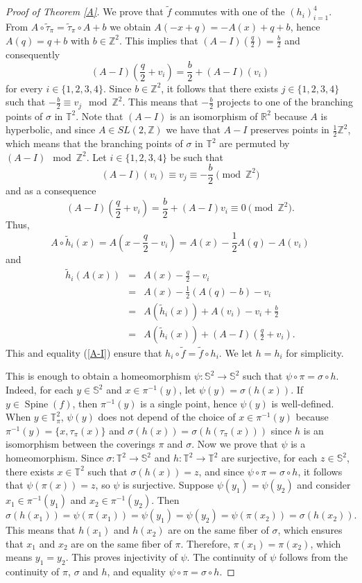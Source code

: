 \documentclass{amsart}
\theoremstyle{plain}
\theoremstyle{definition}
\newcommand{\spine}{\operatorname{Spine}}
\newcommand{\T}{\mathbb{T}}
\newcommand{\Z}{\mathbb{Z}}
\newcommand{\R}{\mathbb{R}}
\begin{document}
\begin{proof}[Proof of Theorem \ref{A}]
We prove that $\tilde f$ commutes with one of the $(h_i)_{i=1}^4$. From $A\circ\tilde\tau_{\pi}=\tilde\tau_{\pi}\circ A+b$ we obtain
$A(-x+q)=-A(x)+q+b$, hence $A(q)=q+b$ with $b\in\Z^2$. This implies that $(A-I)(\frac{q}{2})=\frac{b}{2}$ and consequently
\begin{equation}\label{A-I}
(A-I)\left(\frac{q}{2}+v_i\right)=\frac{b}{2}+(A-I)(v_i)
\end{equation}
for every $i\in\{1,2,3,4\}$. Since $b\in\Z^2$, it follows that there exists $j\in\{1,2,3,4\}$ such that $-\frac{b}{2}\equiv v_j\mod\Z^2$. This means that $-\frac{b}{2}$ projects to one of the branching points of $\sigma$ in $\T^2$. Note that $(A-I)$ is an isomorphism of $\R^2$ because $A$ is hyperbolic, and since $A\in SL(2,\Z)$ we have that $A-I$ preserves points in $\frac{1}{2}\Z^2$, which means that the branching points of $\sigma$ in $\T^2$ are permuted by $(A-I)\mod\Z^2$. Let $i\in\{1,2,3,4\}$ be such that $$(A-I)(v_i)\equiv v_j\equiv-\frac{b}{2}\pmod{\Z^2}$$ and as a consequence
$$(A-I)\left(\frac{q}{2} + v_i\right) = \frac{b}{2} + (A-I)v_i \equiv 0 \pmod{\mathbb{Z}^2}.$$
Thus,
$$A\circ\tilde h_i(x)=A\left(x-\frac{q}{2}-v_i\right)=A(x)-\frac{1}{2}A(q)-A(v_i)$$
and
\begin{eqnarray*}
\tilde h_i(A(x))&=&A(x)-\frac{q}{2}-v_i\\
&=&A(x)-\frac{1}{2}(A(q)-b)-v_i\\
&=&A(\tilde h_i(x))+A(v_i)-v_i+\frac{b}{2}\\
&=&A(\tilde h_i(x))+(A-I)\left(\frac{q}{2}+v_i\right).
\end{eqnarray*}
This and equality (\ref{A-I}) ensure that $h_i\circ\tilde f=\tilde f\circ h_i$. We let $h=h_i$ for simplicity.

This is enough to obtain a homeomorphism 
$\psi\colon\mathbb{S}^2\to\mathbb{S}^2$ such that $\psi\circ\pi = \sigma\circ h$.
Indeed, for each $y\in\mathbb{S}^2$ and $x\in \pi^{-1}(y)$, let $\psi(y)=\sigma(h(x))$. If $y\in\spine(f)$, then $\pi^{-1}(y)$ is a single point, hence $\psi(y)$ is well-defined. When $y\in\mathbb{T}^{2}_{\pi}$, $\psi(y)$ does not depend of the choice of $x\in \pi^{-1}(y)$ because $\pi^{-1}(y)=\{x,\tau_{\pi}(x)\}$ and $\sigma(h(x))=\sigma(h(\tau_{\pi}(x)))$ since $h$ is an isomorphism between the coverings $\pi$ and $\sigma$.
Now we prove that $\psi$ is a homeomorphism. Since $\sigma\colon\mathbb{T}^2 \to \mathbb{S}^2$ and $h\colon\mathbb{T}^2 \to \mathbb{T}^2$ are surjective, for each $z \in \mathbb{S}^2$, there exists $x \in \mathbb{T}^2$ such that $\sigma(h(x)) = z$, and since $\psi \circ \pi = \sigma\circ h$, it follows that $\psi(\pi(x)) = z$, so $\psi$ is surjective. Suppose $\psi(y_1) = \psi(y_2)$ and consider $x_1 \in \pi^{-1}(y_1)$ and $x_2 \in \pi^{-1}(y_2)$. Then $$\sigma(h(x_1))=\psi(\pi(x_1))=\psi(y_1)=\psi(y_2)=\psi(\pi(x_2))=\sigma(h(x_2)).$$ 
This means that $h(x_1)$ and $h(x_2)$ are on the same fiber of $\sigma$, which ensures that $x_1$ and $x_2$ are on the same fiber of $\pi$. Therefore, $\pi(x_1)=\pi(x_2)$, which means $y_1=y_2$. This proves injectivity of $\psi$. The continuity of $\psi$ follows from the continuity of $\pi$, $\sigma$ and $h$, and equality $\psi\circ\pi = \sigma\circ h$.


\end{proof}
\end{document}
